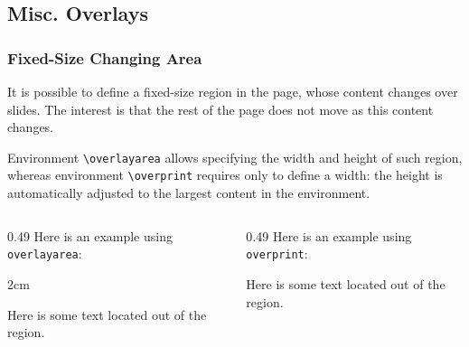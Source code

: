 \documentclass[10pt,    %
    english,            %
    xcolor=table,       %
    envcountsect,       %
    aspectratio=43      %
]{beamer}
\begin{document}
\subsection{Misc. Overlays}
\begin{frame}
    \frametitle{Fixed-Size Changing Area}
    
    It is possible to define a fixed-size region in the page, whose content changes over slides. The interest is that the rest of the page does not move as this content changes.
    
    \medskip
    Environment \texttt{\textbackslash{}overlayarea} allows specifying the width and height of such region, whereas environment \texttt{\textbackslash{}overprint} requires only to define a width: the height is automatically adjusted to the largest content in the environment.
    
    \medskip
    \begin{columns}[T,totalwidth=\textwidth] %
        \begin{column}{0.49\textwidth}
            Here is an example using \texttt{overlayarea}:
            
            \begin{overlayarea}{\textwidth}{2cm}
            \end{overlayarea}
            
            Here is some text located out of the region.
        \end{column}
        \begin{column}{0.49\textwidth}
            Here is an example using \texttt{overprint}:
            
            \begin{overprint}[\textwidth]
            \end{overprint}
            
            Here is some text located out of the region.
        \end{column}
    \end{columns}
\end{frame}
\end{document}
